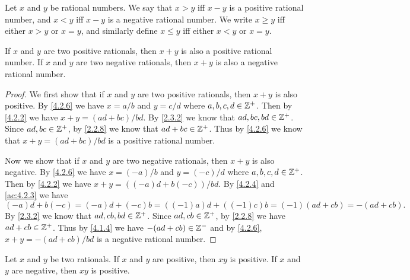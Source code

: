 \begin{defn}\label{4.2.8}
  Let \(x\) and \(y\) be rational numbers.
  We say that \(x > y\) iff \(x - y\) is a positive rational number, and \(x < y\) iff \(x - y\) is a negative rational number.
  We write \(x \geq y\) iff either \(x > y\) or \(x = y\), and similarly define \(x \leq y\) iff either \(x < y\) or \(x = y\).
\end{defn}

\begin{ac}\label{ac:4.2.4}
  If \(x\) and \(y\) are two positive rationals, then \(x + y\) is also a positive rational number.
  If \(x\) and \(y\) are two negative rationals, then \(x + y\) is also a negative rational number.
\end{ac}

\begin{proof}
  We first show that if \(x\) and \(y\) are two positive rationals, then \(x + y\) is also positive.
  By \cref{4.2.6} we have \(x = a / b\) and \(y = c / d\) where \(a, b, c, d \in \mathbb{Z}^+\).
  Then by \cref{4.2.2} we have \(x + y = (ad + bc) / bd\).
  By \cref{2.3.2} we know that \(ad, bc, bd \in \mathbb{Z}^+\).
  Since \(ad, bc \in \mathbb{Z}^+\), by \cref{2.2.8} we know that \(ad + bc \in \mathbb{Z}^+\).
  Thus by \cref{4.2.6} we know that \(x + y = (ad + bc) / bd\) is a positive rational number.

  Now we show that if \(x\) and \(y\) are two negative rationals, then \(x + y\) is also negative.
  By \cref{4.2.6} we have \(x = (-a) / b\) and \(y = (-c) / d\) where \(a, b, c, d \in \mathbb{Z}^+\).
  Then by \cref{4.2.2} we have \(x + y = ((-a)d + b(-c)) / bd\).
  By \cref{4.2.4} and \cref{ac:4.2.3} we have
  \[
    (-a)d + b(-c) = (-a)d + (-c)b = ((-1)a)d + ((-1)c)b = (-1)(ad + cb) = -(ad + cb).
  \]
  By \cref{2.3.2} we know that \(ad, cb, bd \in \mathbb{Z}^+\).
  Since \(ad, cb \in \mathbb{Z}^+\), by \cref{2.2.8} we have \(ad + cb \in \mathbb{Z}^+\).
  Thus by \cref{4.1.4} we have \(-(ad + cb) \in \mathbb{Z}^-\) and by \cref{4.2.6}, \(x + y = -(ad + cb) / bd\) is a negative rational number.
\end{proof}

\begin{ac}\label{ac:4.2.5}
  Let \(x\) and \(y\) be two rationals.
  If \(x\) and \(y\) are positive, then \(xy\) is positive.
  If \(x\) and \(y\) are negative, then \(xy\) is positive.
\end{ac}

